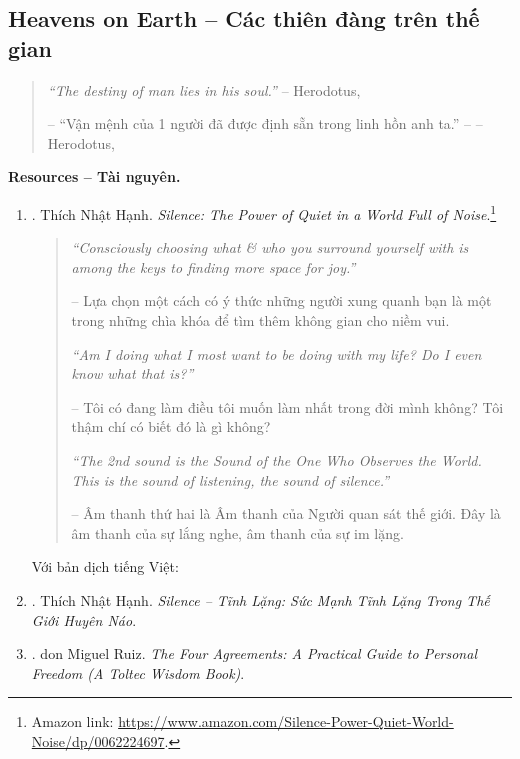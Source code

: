 \documentclass[12pt]{article}
\begin{document}
\subsection{Heavens on Earth -- Các thiên đàng trên thế gian}
\begin{quote}
	{\it``The destiny of man lies in his soul.''} -- {\sc Herodotus}, \cite[p. 1]{Adler_human_nature}
	
	-- ``Vận mệnh của 1 người đã được định sẵn trong linh hồn anh ta.'' -- -- {\sc Herodotus}, \cite[p. 4]{Adler_human_nature_VN}
\end{quote}
\textbf{\textsf{Resources -- Tài nguyên.}}
\begin{enumerate}
	\item \cite{Hanh_silence}. {\sc Thích Nhật Hạnh}. {\it Silence: The Power of Quiet in a World Full of Noise}.\footnote{Amazon link: \url{https://www.amazon.com/Silence-Power-Quiet-World-Noise/dp/0062224697}.}	
	\begin{quotation}
		{\it``Consciously choosing what \& who you surround yourself with is among the keys to finding more space for joy.''}
		
		-- Lựa chọn một cách có ý thức những người xung quanh bạn là một trong những chìa khóa để tìm thêm không gian cho niềm vui.
		
		{\it``Am I doing what I most want to be doing with my life? Do I even know what that is?''}
		
		-- Tôi có đang làm điều tôi muốn làm nhất trong đời mình không? Tôi thậm chí có biết đó là gì không?
		
		{\it``The 2nd sound is the Sound of the One Who Observes the World. This is the sound of listening, the sound of silence.''}
		
		-- Âm thanh thứ hai là Âm thanh của Người quan sát thế giới. Đây là âm thanh của sự lắng nghe, âm thanh của sự im lặng.
	\end{quotation}
	Với bản dịch tiếng Việt:
	\item \cite{Hanh_silence_VN}. {\sc Thích Nhật Hạnh}. {\it Silence -- Tĩnh Lặng: Sức Mạnh Tĩnh Lặng Trong Thế Giới Huyên Náo}.
	\item \cite{Ruiz_4_agreements}. {\sc don Miguel Ruiz}. {\it The Four Agreements: A Practical Guide to Personal Freedom (A Toltec Wisdom Book)}.
	

\end{enumerate}
\end{document}
